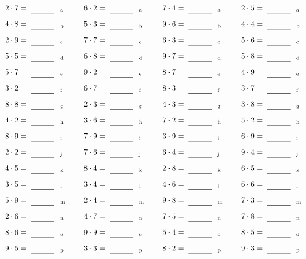 \documentclass
[
  draft    = true,
  fontsize = 11pt,
  parskip  = half-
]
{scrartcl}
\begin{document}
\par\vfill\par
\begin{align*}
    \pline{2\cdot7}&=\rline{a}
  & \pline{6\cdot2}&=\rline{a}
  & \pline{7\cdot4}&=\rline{a}
  & \pline{2\cdot5}&=\rline{a} \\[1ex]
    \pline{4\cdot8}&=\rline{b}
  & \pline{5\cdot3}&=\rline{b}
  & \pline{9\cdot6}&=\rline{b}
  & \pline{4\cdot4}&=\rline{b} \\[1ex]
    \pline{2\cdot9}&=\rline{c}
  & \pline{7\cdot7}&=\rline{c}
  & \pline{6\cdot3}&=\rline{c}
  & \pline{5\cdot6}&=\rline{c} \\[1ex]
    \pline{5\cdot5}&=\rline{d}
  & \pline{6\cdot8}&=\rline{d}
  & \pline{9\cdot7}&=\rline{d}
  & \pline{5\cdot8}&=\rline{d} \\[1ex]
    \pline{5\cdot7}&=\rline{e}
  & \pline{9\cdot2}&=\rline{e}
  & \pline{8\cdot7}&=\rline{e}
  & \pline{4\cdot9}&=\rline{e} \\[1ex]
    \pline{3\cdot2}&=\rline{f}
  & \pline{6\cdot7}&=\rline{f}
  & \pline{8\cdot3}&=\rline{f}
  & \pline{3\cdot7}&=\rline{f} \\[1ex]
    \pline{8\cdot8}&=\rline{g}
  & \pline{2\cdot3}&=\rline{g}
  & \pline{4\cdot3}&=\rline{g}
  & \pline{3\cdot8}&=\rline{g} \\[1ex]
    \pline{4\cdot2}&=\rline{h}
  & \pline{3\cdot6}&=\rline{h}
  & \pline{7\cdot2}&=\rline{h}
  & \pline{5\cdot2}&=\rline{h} \\[1ex]
    \pline{8\cdot9}&=\rline{i}
  & \pline{7\cdot9}&=\rline{i}
  & \pline{3\cdot9}&=\rline{i}
  & \pline{6\cdot9}&=\rline{i} \\[1ex]
    \pline{2\cdot2}&=\rline{j}
  & \pline{7\cdot6}&=\rline{j}
  & \pline{6\cdot4}&=\rline{j}
  & \pline{9\cdot4}&=\rline{j} \\[1ex]
    \pline{4\cdot5}&=\rline{k}
  & \pline{8\cdot4}&=\rline{k}
  & \pline{2\cdot8}&=\rline{k}
  & \pline{6\cdot5}&=\rline{k} \\[1ex]
    \pline{3\cdot5}&=\rline{l}
  & \pline{3\cdot4}&=\rline{l}
  & \pline{4\cdot6}&=\rline{l}
  & \pline{6\cdot6}&=\rline{l} \\[1ex]
    \pline{5\cdot9}&=\rline{m}
  & \pline{2\cdot4}&=\rline{m}
  & \pline{9\cdot8}&=\rline{m}
  & \pline{7\cdot3}&=\rline{m} \\[1ex]
    \pline{2\cdot6}&=\rline{n}
  & \pline{4\cdot7}&=\rline{n}
  & \pline{7\cdot5}&=\rline{n}
  & \pline{7\cdot8}&=\rline{n} \\[1ex]
    \pline{8\cdot6}&=\rline{o}
  & \pline{9\cdot9}&=\rline{o}
  & \pline{5\cdot4}&=\rline{o}
  & \pline{8\cdot5}&=\rline{o} \\[1ex]
    \pline{9\cdot5}&=\rline{p}
  & \pline{3\cdot3}&=\rline{p}
  & \pline{8\cdot2}&=\rline{p}
  & \pline{9\cdot3}&=\rline{p}
\end{align*}
\end{document}
